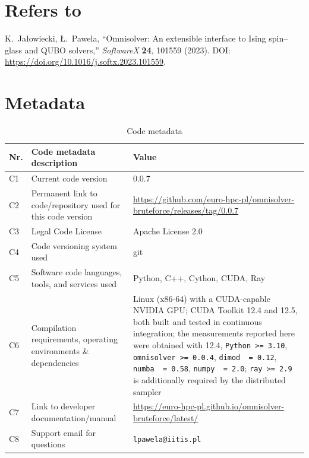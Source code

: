 \documentclass[preprint,12pt,a4paper]{elsarticle}
\newcommand{\cudameas}{12.4}
\begin{document}
\section*{Refers to}
K.~Ja\l{}owiecki, {\L}.~Pawela, ``Omnisolver: An extensible interface to Ising
spin--glass and QUBO solvers,'' \emph{SoftwareX} \textbf{24}, 101559 (2023).
DOI: \url{https://doi.org/10.1016/j.softx.2023.101559}.

\section*{Metadata}
\label{metadata}

\begin{table}[H]
\setlength{\tabcolsep}{4pt}
\begin{tabular}{|l|p{5.6cm}|p{6.4cm}|}
\hline
\textbf{Nr.} & \textbf{Code metadata description} & \textbf{Value} \\
\hline
C1 & Current code version & 0.0.7 \\
\hline
C2 & Permanent link to code/repository used for this code version &
\url{https://github.com/euro-hpc-pl/omnisolver-bruteforce/releases/tag/0.0.7} \\
\hline
C3 & Legal Code License & Apache License 2.0 \\
\hline
C4 & Code versioning system used & git \\
\hline
C5 & Software code languages, tools, and services used & Python, C++, Cython,
CUDA, Ray \\
\hline
C6 & Compilation requirements, operating environments \& dependencies & Linux
(x86-64) with a CUDA-capable NVIDIA GPU; CUDA Toolkit 12.4 and 12.5, both built
and tested in continuous integration; the measurements reported here were
obtained with \cudameas, \texttt{Python >= 3.10}, \texttt{omnisolver >= 0.0.4},
\texttt{dimod ~= 0.12}, \texttt{numba ~= 0.58}, \texttt{numpy ~= 2.0};
\texttt{ray >= 2.9} is additionally required by the distributed sampler \\
\hline
C7 & Link to developer documentation/manual &
\url{https://euro-hpc-pl.github.io/omnisolver-bruteforce/latest/} \\
\hline
C8 & Support email for questions & \verb|lpawela@iitis.pl| \\
\hline
\end{tabular}
\caption{Code metadata}
\label{codeMetadata}
\end{table}
\end{document}
